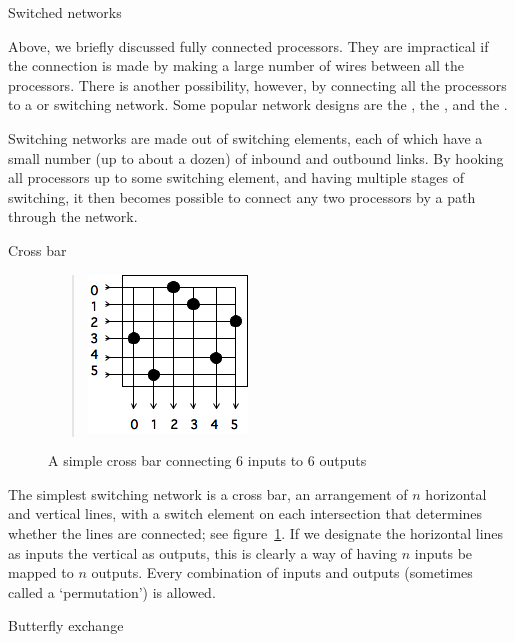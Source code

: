  {Switched networks}
\label{sec:crossbar}

Above, we briefly discussed fully connected processors. They are
impractical if the connection is made by making a large number of
wires between all the processors. There is another possibility,
however, by connecting all the processors to a  or
switching network. Some popular network designs are the
, the , and the
.

Switching networks are made out of switching elements, each of which
have a small number (up to about a dozen) of inbound and outbound
links. By hooking all processors up to some switching element, and
having multiple stages of switching, it then becomes possible to
connect any two processors by a path through the network.

 {Cross bar}

\begin{figure}[ht]
  \begin{quote}
  \includegraphics[scale=.7]{graphics-public/crossbar}
  \end{quote}
  \caption{A simple cross bar connecting 6 inputs to 6 outputs}
  \label{fig:crossbar}
\end{figure}
The simplest switching network is a cross bar, an arrangement of $n$
horizontal and vertical lines, with a switch element on each
intersection that determines whether the lines are connected; see
figure~\ref{fig:crossbar}. If we designate the horizontal lines as
inputs the vertical as outputs, this is clearly a way of having $n$
inputs be mapped to $n$ outputs. Every combination of inputs and
outputs (sometimes called a `permutation') is allowed.

 {Butterfly exchange}

